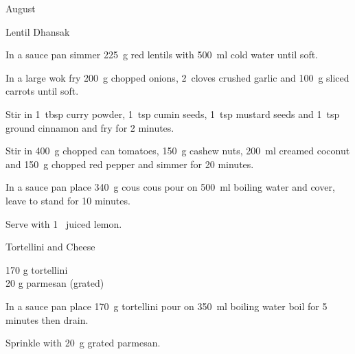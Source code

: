 \begin{menu}{August}
\begin{recipe}{2}{Lentil Dhansak}
	
	
    \begin{instructions}
    \item 
        In a sauce pan simmer
        225~g  red lentils
        with 500~ml  cold water
        until soft.
      \item 
        In a large wok fry
        200~g chopped onions,
        2~cloves crushed garlic
        and
        100~g sliced carrots
        until soft.
      \item 
        Stir in
        1~tbsp  curry powder,
        1~tsp  cumin seeds,
        1~tsp  mustard seeds
        and
        1~tsp  ground cinnamon
        and fry for 2 minutes.
      \item 
        Stir in
        400~g chopped can tomatoes,
        150~g  cashew nuts,
        200~ml  creamed coconut
        and
        150~g chopped red pepper
        and simmer for 20 minutes.
      \item 
    In a
    sauce pan
    place
    340~g  cous cous
    pour on
    500~ml  boiling water
    and cover, leave to stand for 10 minutes.
  \item 
        Serve with
        1~ juiced lemon.
      
    \end{instructions}
    \end{recipe}%
  
    \begin{recipe}{1}{Tortellini and Cheese}%
		\begin{ingredients}
		170 g tortellini  \\
	20 g parmesan (grated) \\
	
		\end{ingredients}
	
	
    \begin{instructions}
    \item 
    In a
    sauce pan
    place
    170~g  tortellini
    pour on
    350~ml  boiling water
    boil for 5 minutes then drain.
  \item 
        Sprinkle with
        20~g grated parmesan.
      
    \end{instructions}
    \end{recipe}%
  
    \clearpage
    \end{menu}
	
